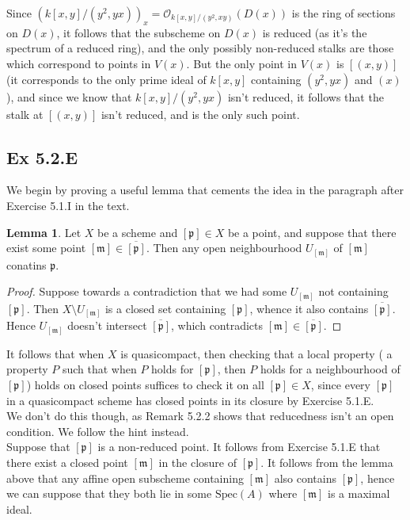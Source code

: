 \documentclass{article}
\theoremstyle{definition}
\newtheorem{lemma}[theorem]{Lemma}
\newcommand{\Spec}{\text{Spec}}
\begin{document}
Since $(k[x, y]/(y^2, yx))_x = \mathcal{O}_{k[x, y]/(y^2, xy)}(D(x))$ is the
ring of sections on $D(x)$, it follows that the subscheme on $D(x)$ is reduced
(as it's the spectrum of a reduced ring), and the only possibly non-reduced
stalks are those which correspond to points in $V(x)$. But the only point in
$V(x)$ is $[(x, y)]$ (it corresponds to the only prime ideal of $k[x, y]$
containing $(y^2, yx)$ and $(x)$), and since we know that $k[x, y]/(y^2, yx)$
isn't reduced, it follows that the stalk at $[(x, y)]$ isn't reduced, and is
the only such point.

\subsection*{Ex 5.2.E}

We begin by proving a useful lemma that cements the idea in the paragraph after
Exercise 5.1.I in the text.

\begin{lemma}
	Let $X$ be a scheme and $[\mathfrak{p}] \in X$ be a point, and suppose that
	there exist some point $[\mathfrak{m}] \in \overline{[\mathfrak{p}]}$. Then
	any open neighbourhood $U_{[\mathfrak{m}]}$ of $[\mathfrak{m}]$ conatins
	$\mathfrak{p}$.
\end{lemma}
\begin{proof}
	Suppose towards a contradiction that we had some $U_{[\mathfrak{m}]}$ not
	containing $[\mathfrak{p}]$. Then $X \setminus U_{[\mathfrak{m}]}$ is a
	closed set containing $[\mathfrak{p}]$, whence it also contains
	$\overline{[\mathfrak{p}]}$. Hence $U_{[\mathfrak{m}]}$ doesn't intersect
	$\overline{[\mathfrak{p}]}$, which contradicts $[\mathfrak{m}] \in
		\overline{[\mathfrak{p}]}$.
\end{proof}

It follows that when $X$ is quasicompact, then checking that a local property (
a property $P$ such that when $P$ holds for $[\mathfrak{p}]$, then $P$ holds
for a neighbourhood of $[\mathfrak{p}]$) holds on closed points suffices to
check it on all $[\mathfrak{p}] \in X$, since every $[\mathfrak{p}]$ in a
quasicompact scheme has closed points in its closure by Exercise 5.1.E. \\

We don't do this though, as Remark 5.2.2 shows that reducedness isn't an open
condition. We follow the hint instead. \\

Suppose that $[\mathfrak{p}]$ is a non-reduced point. It follows from Exercise
5.1.E that there exist a closed point $[\mathfrak{m}]$ in the closure of
$[\mathfrak{p}]$. It follows from the lemma above that any affine open
subscheme containing $[\mathfrak{m}]$ also contains $[\mathfrak{p}]$, hence we
can suppose that they both lie in some $\Spec(A)$ where $[\mathfrak{m}]$ is a
maximal ideal. \\
\end{document}
